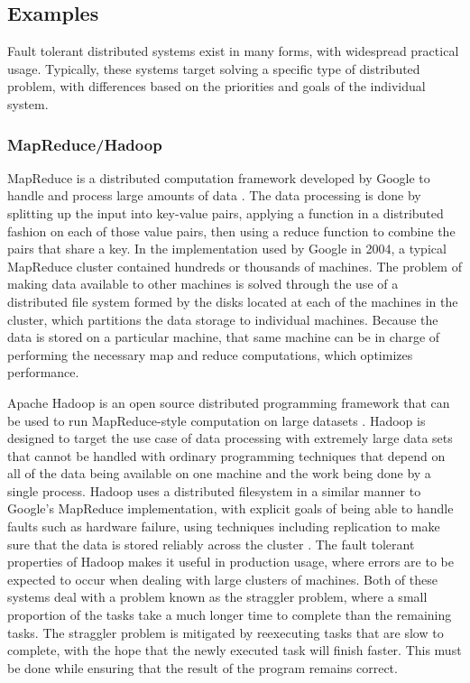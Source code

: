 \documentclass[oneside]{report}
\begin{document}

\subsection{Examples}
Fault tolerant distributed systems exist in many forms, with widespread practical usage.
Typically, these systems target solving a specific type of distributed problem, with differences based on the priorities and goals of the individual system.

\subsubsection{MapReduce/Hadoop}
MapReduce is a distributed computation framework developed by Google to handle and process large amounts of data \cite{dean2004mapreduce}.
The data processing is done by splitting up the input into key-value pairs, applying a function in a distributed fashion on each of those value pairs, then using a reduce function to combine the pairs that share a key.
In the implementation used by Google in 2004, a typical MapReduce cluster contained hundreds or thousands of machines.
The problem of making data available to other machines is solved through the use of a distributed file system formed by the disks located at each of the machines in the cluster, which partitions the data storage to individual machines.
Because the data is stored on a particular machine, that same machine can be in charge of performing the necessary map and reduce computations, which optimizes performance.

\begin{sloppypar}
  Apache Hadoop is an open source distributed programming framework that can be used to run MapReduce-style computation on large datasets \cite{Hadoop}.
  Hadoop is designed to target the use case of data processing with extremely large data sets that cannot be handled with ordinary programming techniques that depend on all of the data being available on one machine and the work being done by a single process.
  Hadoop uses a distributed filesystem in a similar manner to Google's MapReduce implementation, with explicit goals of being able to handle faults such as hardware failure, using techniques including replication to make sure that the data is stored reliably across the cluster \cite{borthakur2007hadoop}.
  The fault tolerant properties of Hadoop makes it useful in production usage, where errors are to be expected to occur when dealing with large clusters of machines.
  Both of these systems deal with a problem known as the straggler problem, where a small proportion of the tasks take a much longer time to complete than the remaining tasks.
  The straggler problem is mitigated by reexecuting tasks that are slow to complete, with the hope that the newly executed task will finish faster.
  This must be done while ensuring that the result of the program remains correct.
\end{sloppypar}
\end{document}
